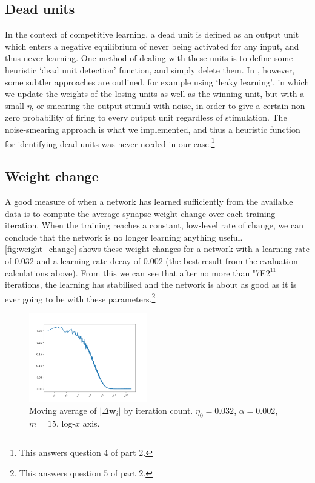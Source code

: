 \documentclass[a4paper, 11pt, twocolumn, final]{article} %
\begin{document}
\subsection{Dead units} \label{sec:deadunits} In the context of competitive
learning, a dead unit is defined as an output unit which enters a negative
equilibrium of never being activated for any input, and thus never learning. One
method of dealing with these units is to define some heuristic `dead unit
detection' function, and simply delete them.  In \cite[p221]{hertz91}, however,
some subtler approaches are outlined, for example using `leaky learning', in
which we update the weights of the losing units as well as the winning unit, but
with a small $\eta$, or smearing the output stimuli with noise, in order to give
a certain non-zero probability of firing to every output unit regardless of
stimulation.  The noise-smearing approach is what we implemented, and thus a
heuristic function for identifying dead units was never needed in our
case.\footnote{This answers question 4 of part 2.}

\subsection{Weight change} \label{sec:weight_change} A good measure of when a
network has learned sufficiently from the available data is to compute the
average synapse weight change over each training iteration.  When the training
reaches a constant, low-level rate of change, we can conclude that the network
is no longer learning anything useful.  \autoref{fig:weight_change} shows these
weight changes for a network with a learning rate of 0.032 and a learning rate
decay of 0.002 (the best result from the evaluation calculations above).  From
this we can see that after no more than \char"7E$2^{11}$ iterations, the
learning has stabilised and the network is about as good as it is ever going to
be with these parameters.\footnote{This answers question 5 of part 2.}

\begin{figure}
  \includegraphics[width=0.46\textwidth]{dw_average.png}
  \caption{Moving average of $|\Delta{}\bm{w}_i|$ by iteration count.
           $\eta_0 = 0.032$, $\alpha = 0.002$, $m = 15$, log-$x$ axis.}
  \label{fig:weight_change}
\end{figure}
\end{document}
